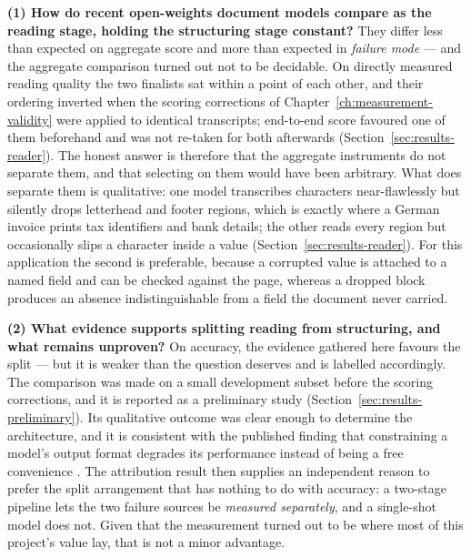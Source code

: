 \textbf{(1) How do recent open-weights document models compare as the reading stage, holding
the structuring stage constant?}
They differ less than expected on aggregate score and more than expected in \emph{failure mode}
--- and the aggregate comparison turned out not to be decidable. On directly measured reading
quality the two finalists sat within a point of each other, and their ordering inverted when
the scoring corrections of Chapter~\ref{ch:measurement-validity} were applied to identical
transcripts; end-to-end score favoured one of them beforehand and was not re-taken for both
afterwards (Section~\ref{sec:results-reader}). The honest answer is therefore that the aggregate
instruments do not separate them, and that selecting on them would have been arbitrary. What does separate them is
qualitative: one model transcribes characters near-flawlessly but silently drops letterhead and
footer regions, which is exactly where a German invoice prints tax identifiers and bank details;
the other reads every region but occasionally slips a character inside a value
(Section~\ref{sec:results-reader}). For this application the second is preferable, because a corrupted
value is attached to a named field and can be checked against the page, whereas a dropped block
produces an absence indistinguishable from a field the document never carried.

\textbf{(2) What evidence supports splitting reading from structuring, and what remains
unproven?} On accuracy, the evidence gathered here favours the split --- but it is weaker than the
question deserves and is labelled accordingly. The comparison was made on a small
development subset before the scoring corrections, and it is reported as a preliminary study
(Section~\ref{sec:results-preliminary}). Its qualitative outcome was clear enough to determine the
architecture, and it is consistent with the published finding that constraining a model's output
format degrades its performance instead of being a free convenience \parencite{tam2024format}. The
attribution result then supplies an independent reason to prefer the split arrangement that has
nothing to do with accuracy: a two-stage pipeline lets the two failure sources be
\emph{measured separately}, and a single-shot model does not. Given that the measurement turned
out to be where most of this project's value lay, that is not a minor advantage.

